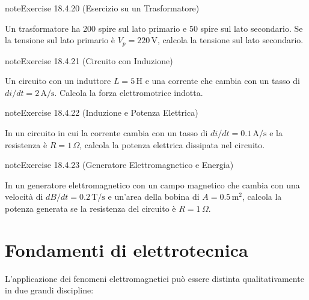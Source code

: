 \documentclass[letterpaper,10pt,italian]{jupyterBook}
\begin{document}
\begin{sphinxadmonition}{note}{Exercise 18.4.20 (Esercizio su un Trasformatore)}



\sphinxAtStartPar
Un trasformatore ha 200 spire sul lato primario e 50 spire sul lato secondario. Se la tensione sul lato primario è \(V_p = 220 \, \text{V}\), calcola la tensione sul lato secondario.
\end{sphinxadmonition}
 \label{exercise:ch/electromagnetism/electromagnetism-general-problems-exercise-20}

\begin{sphinxadmonition}{note}{Exercise 18.4.21 (Circuito con Induzione)}



\sphinxAtStartPar
Un circuito con un induttore \(L = 5 \, \text{H}\) e una corrente che cambia con un tasso di \(di/dt = 2 \, \text{A/s}\). Calcola la forza elettromotrice indotta.
\end{sphinxadmonition}
 \label{exercise:ch/electromagnetism/electromagnetism-general-problems-exercise-21}

\begin{sphinxadmonition}{note}{Exercise 18.4.22 (Induzione e Potenza Elettrica)}



\sphinxAtStartPar
In un circuito in cui la corrente cambia con un tasso di \(di/dt = 0.1 \, \text{A/s}\) e la resistenza è \(R = 1 \, \Omega\), calcola la potenza elettrica dissipata nel circuito.
\end{sphinxadmonition}
 \label{exercise:ch/electromagnetism/electromagnetism-general-problems-exercise-22}

\begin{sphinxadmonition}{note}{Exercise 18.4.23 (Generatore Elettromagnetico e Energia)}



\sphinxAtStartPar
In un generatore elettromagnetico con un campo magnetico che cambia con una velocità di \(dB/dt = 0.2 \, \text{T/s}\) e un’area della bobina di \(A = 0.5 \, \text{m}^2\), calcola la potenza generata se la resistenza del circuito è \(R = 1 \, \Omega\).
\end{sphinxadmonition}

\sphinxstepscope


\chapter{Fondamenti di elettrotecnica}
\label{\detokenize{ch/electromagnetism/electrical-engineering:fondamenti-di-elettrotecnica}}\label{\detokenize{ch/electromagnetism/electrical-engineering:physics-hs-electromagnetism-electric-engineering}}\label{\detokenize{ch/electromagnetism/electrical-engineering::doc}}
\sphinxAtStartPar
L’applicazione dei fenomeni elettromagnetici può essere distinta qualitativamente in due grandi discipline:
\end{document}
